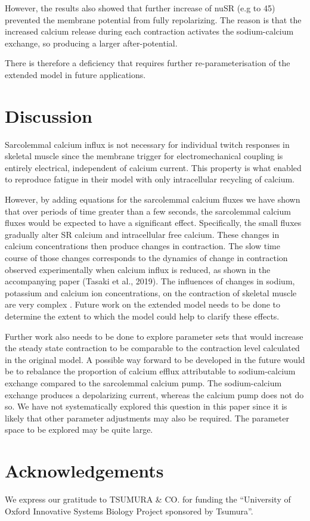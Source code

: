 \documentclass[fleqn,10pt]{physiome}
\begin{document}
However, the results also showed that further increase of nuSR (e.g to 45) prevented the membrane potential from fully repolarizing. The reason is that the increased calcium release during each contraction activates the sodium-calcium exchange, so producing a larger after-potential. 

There is therefore a deficiency that requires further re-parameterisation of the extended model in future applications.\newline

\section{Discussion}


Sarcolemmal calcium influx is not necessary for individual twitch responses in skeletal muscle since the membrane trigger for electromechanical coupling is entirely electrical, independent of calcium current. This property is what enabled \citet{shorten2007mathematical} to reproduce fatigue in their model with only intracellular recycling of calcium.\newline

However, by adding equations for the sarcolemmal calcium fluxes we have shown that over periods of time greater than a few seconds, the sarcolemmal calcium fluxes would be expected to have a significant effect.  Specifically, the small fluxes gradually alter SR calcium and intracellular free calcium. These changes in calcium concentrations then produce changes in contraction. The slow time course of those changes corresponds to the dynamics of change in contraction observed experimentally when calcium influx is reduced, as shown in the accompanying paper (Tasaki et al., 2019). The influences of changes in sodium, potassium and calcium ion concentrations, on the contraction of skeletal muscle are very complex \citep{cairns1998role, cairns2003changes, cairns2008multiple}. Future work on the extended model needs to be done to determine the extent to which the model could help to clarify these effects. \newline

Further work also needs to be done to explore parameter sets that would increase the steady state contraction to be comparable to the contraction level calculated in the original model. A possible way forward to be developed in the future would be to rebalance the proportion of calcium efflux attributable to sodium-calcium exchange compared to the sarcolemmal calcium pump. The sodium-calcium exchange produces a depolarizing current, whereas the calcium pump does not do so. We have not systematically explored this question in this paper since it is likely that other parameter adjustments may also be required. The parameter space to be explored may be quite large.

\section{Acknowledgements}
We express our gratitude to TSUMURA & CO. for funding the “University of Oxford Innovative Systems Biology Project sponsored by Tsumura”. 


\end{document}
